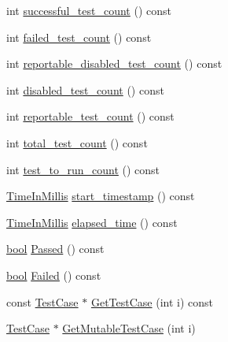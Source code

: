 \begin{DoxyCompactItemize}
\item 
int \hyperlink{classtesting_1_1internal_1_1UnitTestImpl_ac363f681cbecf10fea5c04408b98e744}{successful\+\_\+test\+\_\+count} () const
\item 
int \hyperlink{classtesting_1_1internal_1_1UnitTestImpl_ad0abe95b66466268363d7fa407bac41b}{failed\+\_\+test\+\_\+count} () const
\item 
int \hyperlink{classtesting_1_1internal_1_1UnitTestImpl_a04827d118a329af68a1de2d6b93eb4e5}{reportable\+\_\+disabled\+\_\+test\+\_\+count} () const
\item 
int \hyperlink{classtesting_1_1internal_1_1UnitTestImpl_a0c18b2a9cb240722b1e38a3530aa2269}{disabled\+\_\+test\+\_\+count} () const
\item 
int \hyperlink{classtesting_1_1internal_1_1UnitTestImpl_addb3896c4e0973bb5d2744fcb158afce}{reportable\+\_\+test\+\_\+count} () const
\item 
int \hyperlink{classtesting_1_1internal_1_1UnitTestImpl_a89e8531ee2ba3f0aadc27a95ac6149f1}{total\+\_\+test\+\_\+count} () const
\item 
int \hyperlink{classtesting_1_1internal_1_1UnitTestImpl_a0f15365d1d1ce00eaeb6f8a1370113ec}{test\+\_\+to\+\_\+run\+\_\+count} () const
\item 
\hyperlink{namespacetesting_1_1internal_a66a845df404b38fe85c5e14a069f255a}{Time\+In\+Millis} \hyperlink{classtesting_1_1internal_1_1UnitTestImpl_abb02dfd689760c6323acec725d9631d5}{start\+\_\+timestamp} () const
\item 
\hyperlink{namespacetesting_1_1internal_a66a845df404b38fe85c5e14a069f255a}{Time\+In\+Millis} \hyperlink{classtesting_1_1internal_1_1UnitTestImpl_a4376881063f945dcc8ec4dbb38b5ecc1}{elapsed\+\_\+time} () const
\item 
\hyperlink{classbool}{bool} \hyperlink{classtesting_1_1internal_1_1UnitTestImpl_ae8e461369acfec902da382bc02297fe5}{Passed} () const
\item 
\hyperlink{classbool}{bool} \hyperlink{classtesting_1_1internal_1_1UnitTestImpl_a0c95d1b56b5f33057afc516db05ac313}{Failed} () const
\item 
const \hyperlink{classtesting_1_1TestCase}{Test\+Case} $\ast$ \hyperlink{classtesting_1_1internal_1_1UnitTestImpl_a6438e18ea4904d239a3db7b036a52229}{Get\+Test\+Case} (int i) const
\item 
\hyperlink{classtesting_1_1TestCase}{Test\+Case} $\ast$ \hyperlink{classtesting_1_1internal_1_1UnitTestImpl_a2ca71a08060037357fc7e1a406b89add}{Get\+Mutable\+Test\+Case} (int i)
\item 

\end{DoxyCompactItemize}
